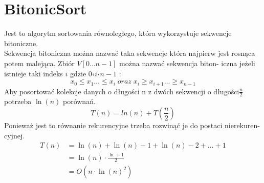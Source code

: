 

\section{BitonicSort}
Jest to algorytm sortowania równoległego, która wykorzystuje sekwencje
bitoniczne.\\
Sekwencja bitoniczna można nazwać taka sekwencje która najpierw jest
rosnąca potem malejąca. Zbiór $V [0 \ldots n−1]$ można nazwać sekwencja biton-
iczna jeżeli istnieje taki indeks $i$ gdzie $0 ‹ i ‹ n − 1$ :
\begin{equation*}
x_0 \leq x_1 \ldots \leq x_i \; oraz \; x_i \geq x_{i+1} \ldots \geq x_{n−1}
\end{equation*}
Aby posortować kolekcje danych o długości n z dwóch sekwencji o długości$\frac{n}{2}$
potrzeba $\ln(n)$ porównań.
\begin{equation*}
T(n) = ln(n) + T( \frac{n}{2})
\end{equation*}
Ponieważ jest to równanie rekurencyjne trzeba rozwinąć je do postaci nierekuren-
cyjnej.
\begin{align*}
T(n) &= \ln(n) + \ln(n) − 1 + \ln(n) − 2 + \ldots + 1 \\
&= \ln(n) \cdot \frac{\ln+1}{2} \\
&= O(n \cdot \ln(n)^2 )
\end{align*}

